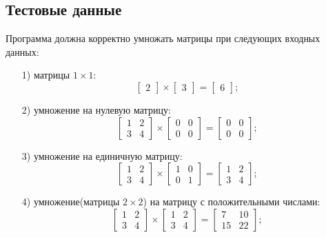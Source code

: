 \documentclass[a4paper,12pt]{article}
\begin{document}
%    
    \subsection{Тестовые данные}
    \label{fig:test_data}

    Программа должна корректно умножать матрицы при следующих входных данных:
\\
\begin{enumerate}
	\item[1)] матрицы $1 \times 1$:
	\[ \begin{bmatrix}
2
\end{bmatrix} \times 
\begin{bmatrix}
3
\end{bmatrix} =
\begin{bmatrix}
6
\end{bmatrix}; \]

	\item[2)] умножение на нулевую матрицу:
	\[ \begin{bmatrix}
1 & 2 \\
3 & 4
\end{bmatrix} \times 
\begin{bmatrix}
0 & 0 \\
0 & 0
\end{bmatrix} =
\begin{bmatrix}
0 & 0 \\
0 & 0
\end{bmatrix}; \]

	\item[3)] умножение на единичную матрицу:
\[ \begin{bmatrix}
1 & 2 \\
3 & 4
\end{bmatrix} \times 
\begin{bmatrix}
1 & 0 \\
0 & 1
\end{bmatrix} =
\begin{bmatrix}
1 & 2 \\
3 & 4
\end{bmatrix}; \]

		\item[4)] умножение(матрицы $2 \times 2$) на матрицу с положительными числами:
\[ \begin{bmatrix}
1 & 2 \\
3 & 4
\end{bmatrix} \times 
\begin{bmatrix}
1 & 2 \\
3 & 4
\end{bmatrix} =
\begin{bmatrix}
7 & 10 \\
15 & 22
\end{bmatrix}; \]


\end{enumerate}
\end{document}

